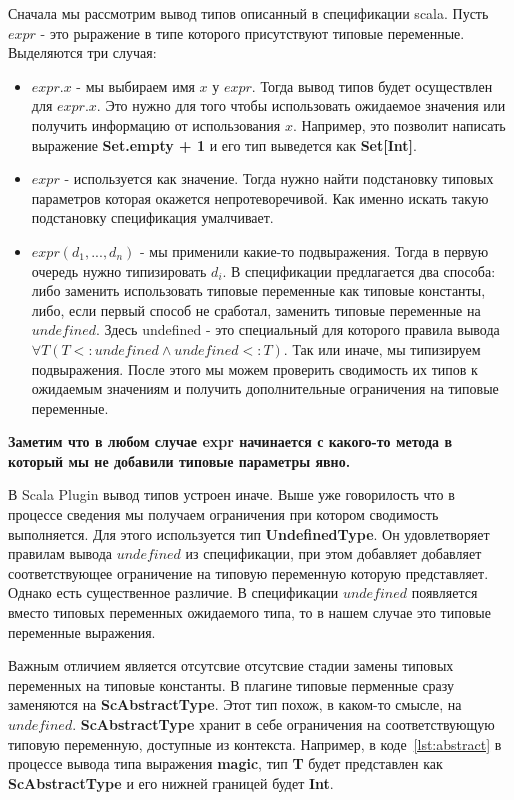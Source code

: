 Сначала мы рассмотрим вывод типов описанный в спецификации scala.
Пусть $expr$ - это рыражение в типе которого присутствуют типовые переменные.
Выделяются три случая:
\begin{itemize}
  \item $expr.x$ - мы выбираем имя $x$ у $expr$.
  Тогда вывод типов будет осуществлен для $expr.x$.
  Это нужно для того чтобы использовать ожидаемое значения или получить
  информацию от использования $x$.
  Например, это позволит написать выражение \textbf{Set.empty + 1} и его тип
  выведется как \textbf{Set[Int]}.
  \item $expr$ - используется как значение.
  Тогда нужно найти подстановку типовых параметров которая окажется
  непротеворечивой.
  Как именно искать такую подстановку спецификация умалчивает.
  \item $expr(d_1, ..., d_n)$ - мы применили какие-то подвыражения.
  Тогда в первую очередь нужно типизировать $d_i$.
  В спецификации предлагается два способа:
  либо заменить использовать типовые переменные как типовые константы,
  либо, если первый способ не сработал, заменить типовые переменные на $undefined$.
  Здесь undefined - это специальный для которого правила вывода
  $\forall T (T <: undefined \land undefined <: T)$.
  Так или иначе, мы типизируем подвыражения.
  После этого мы можем проверить сводимость их типов к ожидаемым значениям и
  получить дополнительные ограничения на типовые переменные.
\end{itemize}

\textbf{Заметим что в любом случае expr начинается с какого-то метода в который
мы не добавили типовые параметры явно.}

В Scala Plugin вывод типов устроен иначе.
Выше уже говорилость что в процессе сведения мы получаем ограничения при котором
сводимость выполняется.
Для этого используется тип \textbf{UndefinedType}.
Он удовлетворяет правилам вывода $undefined$ из спецификации, при этом добавляет
добавляет соответствующее ограничение на типовую переменную которую представляет.
Однако есть существенное различие.
В спецификации $undefined$ появляется вместо типовых переменных ожидаемого типа,
то в нашем случае это типовые переменные выражения.

Важным отличием является отсутсвие отсутсвие стадии замены типовых переменных на
типовые константы. В плагине типовые перменные сразу заменяются на
\textbf{ScAbstractType}.
Этот тип похож, в каком-то смысле, на $undefined$.
\textbf{ScAbstractType} хранит в себе ограничения на соответствующую типовую
переменную, доступные из контекста.
Например, в коде~\ref{lst:abstract} в процессе вывода типа выражения
\textbf{magic}, тип \textbf{T} будет представлен как \textbf{ScAbstractType} и
его нижней границей будет \textbf{Int}.

